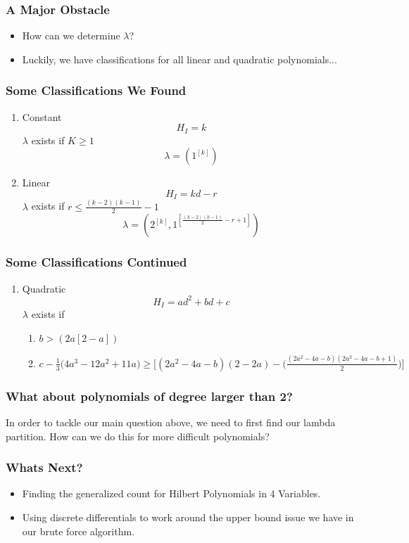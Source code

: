 \documentclass{beamer}
\begin{document}
\begin{frame}
	\frametitle{A Major Obstacle}
	\begin{itemize}
	\item How can we determine $\lambda$? 
	\item Luckily, we have classifications for all linear and quadratic polynomials...
	\end{itemize}
\end{frame}


\begin{frame}
	\frametitle{Some Classifications We Found}
	\begin{enumerate}
				\item Constant
				\[H_I=k \]
				$\lambda$ exists if $K\geq 1$
				\[\lambda = (1^{[k]})\]
				\item Linear
				\[H_I=kd-r\]
				$\lambda$ exists if $r\leq \frac{(k-2)(k-1)}{2}-1$
				\[\lambda = (2^{[k]}, 1^{[\frac{(k-2)(k-1)}{2}-r+1]})\]

	\end{enumerate}
\end{frame}

\begin{frame}
	\frametitle{Some Classifications Continued}
	\begin{enumerate}
				\item Quadratic
				\[H_I=ad^2+bd+c\]
				$\lambda$ exists if
				\begin{enumerate}
					 \item $b > (2a[2-a])$
					\item $c - \frac{1}{3}\big(4a^3-12a^2+11a\big)\geq  \Big[(2a^2-4a-b)(2-2a)-\Big(\frac{(2a^2-4a-b)(2a^2-4a-b+1)}{2}\Big)\Big]$
				\end{enumerate}
	\end{enumerate}
\end{frame}

\begin{frame}
	\frametitle{What about polynomials of degree larger than 2?}
	In order to tackle our main question above, we need to first find our lambda partition. How can we do this for more difficult polynomials? 
\end{frame}


\begin{frame}
	\frametitle{Whats Next?}
	\begin{itemize}
	\item Finding the generalized count for Hilbert Polynomials in 4 Variables.
	\item Using discrete differentials to work around the upper bound issue we have in our brute force algorithm. 
	\end{itemize}
\end{frame}
\end{document}
